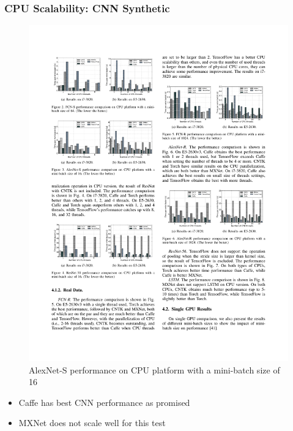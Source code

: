\begin{frame}
	\MyLogo
	\frametitle{CPU Scalability: CNN Synthetic}  

	\begin{figure}[htbp] 
		\includegraphics[width=\linewidth]{figures/AlexNet-S1.pdf} 
		\caption{AlexNet-S performance on CPU platform with a mini-batch size of 16}
	\end{figure}

\pause
	
\vskip -10pt
\begin{mdframed}[style=mystyle1]
\begin{itemize}
\item Caffe has best CNN performance as promised
\item MXNet does not scale well for this test
\end{itemize}
\end{mdframed}
	
\end{frame}

